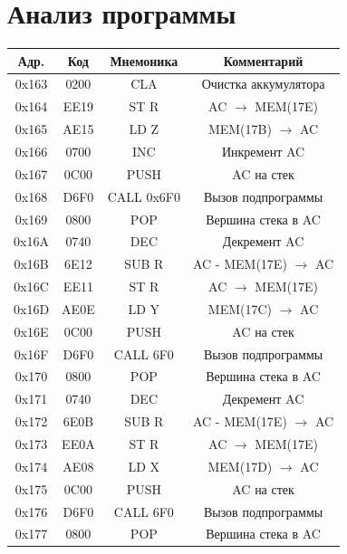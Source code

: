 \documentclass[12pt,a4paper]{report}
\begin{document}
    \section*{Анализ программы}
    \begin{longtable}{|c|c|c|c|}
        \hline
        Адр. & Код & Мнемоника & Комментарий \\
        \hline
        0x163 & 0200 & CLA & Очистка аккумулятора \\
        \hline
        0x164 & EE19 & ST R & AC $\rightarrow$ MEM(17E) \\
        \hline
        0x165 & AE15 & LD Z & MEM(17B) $\rightarrow$ AC \\
        \hline
        0x166 & 0700 & INC & Инкремент AC \\
        \hline
        0x167 & 0C00 & PUSH & AC на стек \\
        \hline
        0x168 & D6F0 & CALL 0x6F0 & Вызов подпрограммы \\
        \hline
        0x169 & 0800 & POP & Вершина стека в AC \\
        \hline
        0x16A & 0740 & DEC & Декремент AC \\
        \hline
        0x16B & 6E12 & SUB R & AC - MEM(17E) $\rightarrow$ AC \\
        \hline
        0x16C & EE11 & ST R & AC $\rightarrow$ MEM(17E) \\
        \hline
        0x16D & AE0E & LD Y & MEM(17C) $\rightarrow$ AC \\
        \hline
        0x16E & 0C00 & PUSH & AC на стек \\
        \hline
        0x16F & D6F0 & CALL 6F0 & Вызов подпрограммы \\
        \hline
        0x170 & 0800 & POP & Вершина стека в AC \\
        \hline
        0x171 & 0740 & DEC & Декремент AC \\
        \hline
        0x172 & 6E0B & SUB R & AC - MEM(17E) $\rightarrow$ AC \\
        \hline
        0x173 & EE0A & ST R & AC $\rightarrow$ MEM(17E) \\
        \hline
        0x174 & AE08 & LD X & MEM(17D) $\rightarrow$ AC \\
        \hline
        0x175 & 0C00 & PUSH & AC на стек \\
        \hline
        0x176 & D6F0 & CALL 6F0 & Вызов подпрограммы \\
        \hline
        0x177 & 0800 & POP & Вершина стека в AC \\

\end{longtable}
\end{document}
